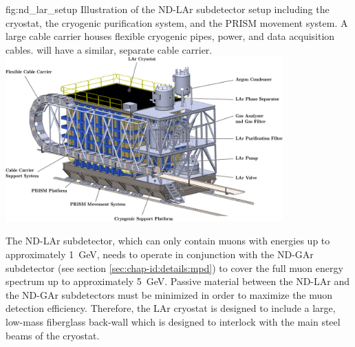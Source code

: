 \begin{dunefigure}{fig:nd_lar_setup}
{Illustration of the ND-LAr subdetector setup including the cryostat, the cryogenic purification system, and the PRISM movement system. A large cable carrier houses flexible cryogenic pipes, power, and data acquisition cables.  will have a similar, separate cable carrier.}
\includegraphics[width=0.8\textwidth]{graphics/i-and-i/nd_lar_setup}
\end{dunefigure}

The ND-LAr subdetector, which can only contain muons with energies up to approximately \SI{1}{\GeV}, needs to operate in conjunction with the ND-GAr subdetector (see section \ref{sec:chap-id:details:mpd}) to cover the full muon energy spectrum up to approximately \SI{5}{\GeV}. Passive material between the ND-LAr and the ND-GAr subdetectors must be minimized in order to maximize the muon detection efficiency. Therefore, the LAr cryostat is designed to include a large, low-mass fiberglass back-wall which is designed to interlock with the main steel beams of the cryostat.



